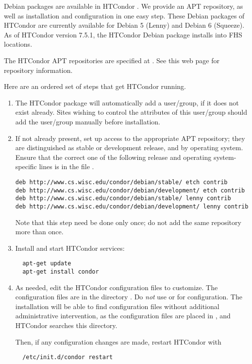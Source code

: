 Debian packages are available in HTCondor \VersionNotice.
We provide an APT repository, as well as 
installation and configuration in one easy step.
These Debian packages of HTCondor are currently available for 
Debian 5 (Lenny) and Debian 6 (Squeeze).
As of HTCondor version 7.5.1, 
the HTCondor Debian package installs into FHS locations.

The HTCondor APT repositories are specified at
  .
See this web page for repository information.

Here are an ordered set of steps that get HTCondor running.
\begin{enumerate}
\item The HTCondor package will automatically add a  user/group,
if it does not exist already.
Sites wishing to control the attributes of this user/group 
should add the  user/group manually before installation.

\item If not already present,
set up access to the appropriate APT repository;
they are distinguished as stable or development release,
and by operating system. 
Ensure that the correct one of the following release and 
operating system-specific lines is in 
the file  .
\footnotesize
\begin{verbatim}
deb http://www.cs.wisc.edu/condor/debian/stable/ etch contrib
deb http://www.cs.wisc.edu/condor/debian/development/ etch contrib
deb http://www.cs.wisc.edu/condor/debian/stable/ lenny contrib
deb http://www.cs.wisc.edu/condor/debian/development/ lenny contrib
\end{verbatim}
\normalsize
Note that this step need be done only once;
do not add the same repository more than once.

\item Install and start HTCondor services:
\begin{verbatim}
  apt-get update
  apt-get install condor
\end{verbatim}

\item As needed, edit the HTCondor configuration files to customize.
The configuration files are in the directory  .
Do \emph{not} use  or  for configuration.
The installation will be able to find configuration files without
additional administrative intervention,
as the configuration files are placed in ,
and HTCondor searches this directory.

Then, if any configuration changes are made, restart HTCondor with
\begin{verbatim}
  /etc/init.d/condor restart
\end{verbatim}

\end{enumerate}

